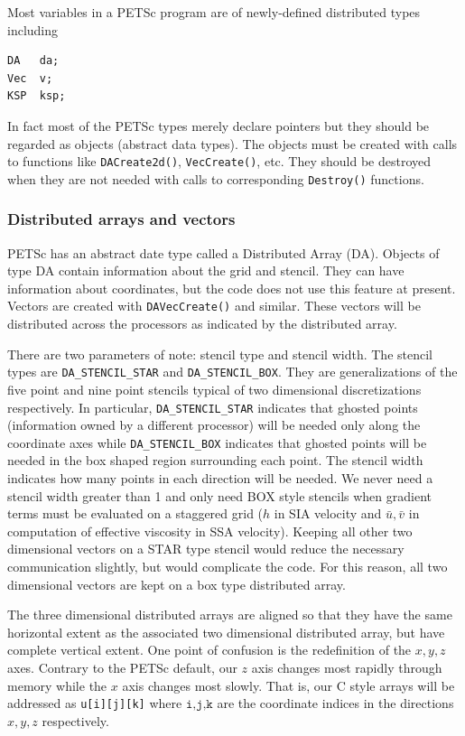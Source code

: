 \documentclass[11pt,final]{amsart}
\renewcommand{\t}[1]{\texttt{#1}}
\begin{document}
Most variables in a PETSc program are of newly-defined distributed types including
\begin{verbatim}
DA   da;
Vec  v;
KSP  ksp;
\end{verbatim}
In fact most of the PETSc types merely declare pointers but they should be regarded as objects (abstract data types).  The objects must be created with calls to functions like \t{DACreate2d()}, \t{VecCreate()}, etc.  They should be destroyed when they are not needed with calls to corresponding \t{Destroy()} functions.

\subsubsection*{Distributed arrays and vectors} PETSc has an abstract date type called a Distributed Array (DA). Objects of type DA contain
information about the grid and stencil. They can have information about coordinates, but
the code does not use this feature at present. Vectors are created with
\texttt{DAVecCreate()} and similar. These vectors will be distributed across the
processors as indicated by the distributed array.

There are two parameters of note: stencil type and stencil width.  The stencil types are
\verb|DA_STENCIL_STAR| and \verb|DA_STENCIL_BOX|.  They are generalizations of the five
point and nine point stencils typical of two dimensional discretizations respectively.  In
particular, \verb|DA_STENCIL_STAR| indicates that ghosted points (information owned by a
different processor) will be needed only along the coordinate axes while
\verb|DA_STENCIL_BOX| indicates that ghosted points will be needed in the box shaped
region surrounding each point.  The stencil width indicates how many points in each
direction will be needed.  We never need a stencil width greater than 1 and only need BOX
style stencils when gradient terms must be evaluated on a staggered grid ($h$ in SIA
velocity and $\bar{u},\bar{v}$ in computation of effective viscosity in SSA
velocity).  Keeping all other two dimensional vectors on a STAR type stencil
would reduce the necessary communication slightly, but would complicate the code.  For this
reason, all two dimensional vectors are kept on a box type distributed array.

The three dimensional distributed arrays are aligned so that they have the same horizontal
extent as the associated two dimensional distributed array, but have complete vertical
extent. One point of confusion is the redefinition of the $x,y,z$ axes. Contrary to the
PETSc default, our $z$ axis changes most rapidly through memory while the $x$ axis changes
most slowly. That is, our C style arrays will be addressed as \texttt{u[i][j][k]} where
$\texttt{i,j,k}$ are the coordinate indices in the directions $x,y,z$ respectively.
\end{document}
